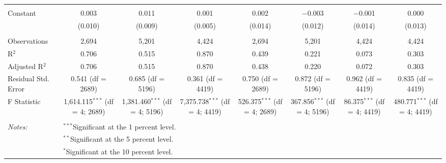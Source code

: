 \begin{table}[!htbp]
\begin{tabular}{@{\extracolsep{5pt}}lccccccc}
  & & & & & & & \\ 
 Constant & 0.003 & 0.011 & 0.001 & 0.002 & $-$0.003 & $-$0.001 & 0.000 \\ 
  & (0.010) & (0.009) & (0.005) & (0.014) & (0.012) & (0.014) & (0.013) \\ 
  & & & & & & & \\ 
Observations & 2,694 & 5,201 & 4,424 & 2,694 & 5,201 & 4,424 & 4,424 \\ 
R$^{2}$ & 0.706 & 0.515 & 0.870 & 0.439 & 0.221 & 0.073 & 0.303 \\ 
Adjusted R$^{2}$ & 0.706 & 0.515 & 0.870 & 0.438 & 0.220 & 0.072 & 0.303 \\ 
Residual Std. Error & 0.541 (df = 2689) & 0.685 (df = 5196) & 0.361 (df = 4419) & 0.750 (df = 2689) & 0.872 (df = 5196) & 0.962 (df = 4419) & 0.835 (df = 4419) \\ 
F Statistic & 1,614.115$^{***}$ (df = 4; 2689) & 1,381.460$^{***}$ (df = 4; 5196) & 7,375.738$^{***}$ (df = 4; 4419) & 526.375$^{***}$ (df = 4; 2689) & 367.856$^{***}$ (df = 4; 5196) & 86.375$^{***}$ (df = 4; 4419) & 480.771$^{***}$ (df = 4; 4419) \\ 
\hline \\[-1.8ex] 
\textit{Notes:} & \multicolumn{7}{l}{$^{***}$Significant at the 1 percent level.} \\ 
 & \multicolumn{7}{l}{$^{**}$Significant at the 5 percent level.} \\ 
 & \multicolumn{7}{l}{$^{*}$Significant at the 10 percent level.} \\ 
\end{tabular} 
\end{table} 
